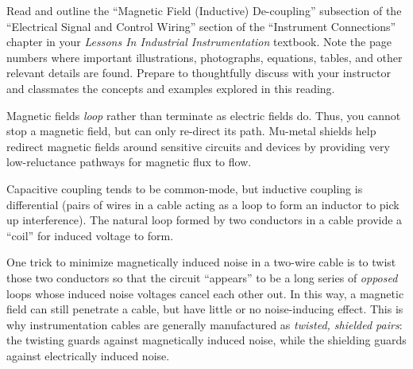 

Read and outline the ``Magnetic Field (Inductive) De-coupling'' subsection of the ``Electrical Signal and Control Wiring'' section of the ``Instrument Connections'' chapter in your {\it Lessons In Industrial Instrumentation} textbook.  Note the page numbers where important illustrations, photographs, equations, tables, and other relevant details are found.  Prepare to thoughtfully discuss with your instructor and classmates the concepts and examples explored in this reading.














Magnetic fields {\it loop} rather than terminate as electric fields do.  Thus, you cannot stop a magnetic field, but can only re-direct its path.  Mu-metal shields help redirect magnetic fields around sensitive circuits and devices by providing very low-reluctance pathways for magnetic flux to flow.

\vskip 10pt

Capacitive coupling tends to be common-mode, but inductive coupling is differential (pairs of wires in a cable acting as a loop to form an inductor to pick up interference).  The natural loop formed by two conductors in a cable provide a ``coil'' for induced voltage to form.

\vskip 10pt

One trick to minimize magnetically induced noise in a two-wire cable is to twist those two conductors so that the circuit ``appears'' to be a long series of {\it opposed} loops whose induced noise voltages cancel each other out.  In this way, a magnetic field can still penetrate a cable, but have little or no noise-inducing effect.  This is why instrumentation cables are generally manufactured as {\it twisted, shielded pairs}: the twisting guards against magnetically induced noise, while the shielding guards against electrically induced noise.









